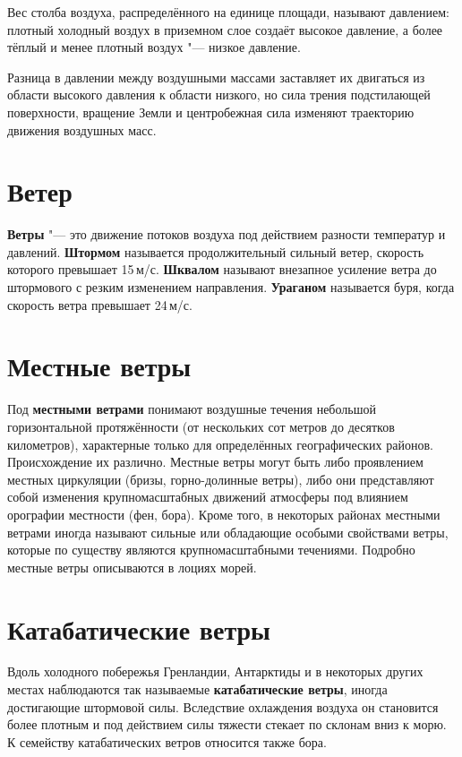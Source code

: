 \documentclass[a4paper, 12pt, twoside, final, book, russian, fittopage, cyremdash, openright]{ncc}
\newcommand{\mps}{\,м/с\xspace}
\begin{document}
Вес столба воздуха, распределённого на единице площади, называют
давлением: плотный холодный воздух в приземном слое
создаёт высокое давление, а более тёплый и менее плотный воздух "---
низкое давление.

Разница в давлении между воздушными массами заставляет их двигаться из
области высокого давления к области низкого, но сила трения
подстилающей поверхности, вращение Земли и центробежная сила изменяют
траекторию движения воздушных масс.

\section{Ветер}
\label{sec:wind}

\textbf{Ветры} "--- это движение потоков воздуха под
действием разности температур и
давлений. \textbf{Штормом} называется продолжительный
сильный ветер, скорость которого превышает 15\mps.
\textbf{Шквалом} называют внезапное усиление ветра до
штормового с резким изменением направления.
\textbf{Ураганом} называется буря, когда скорость ветра
превышает 24\mps.

\section{Местные ветры}
\label{sec:local_winds}

Под \textbf{местными ветрами} понимают воздушные течения небольшой
горизонтальной протяжённости (от нескольких сот метров до десятков
километров), характерные только для определённых географических
районов. Происхождение их различно. Местные ветры могут быть либо
проявлением местных циркуляции (бризы, горно-долинные
ветры), либо они представляют собой
изменения крупномасштабных движений атмосферы под влиянием орографии
местности (фен, бора). Кроме того, в некоторых
районах местными ветрами иногда называют сильные или обладающие
особыми свойствами ветры, которые по существу являются
крупномасштабными течениями. Подробно местные ветры описываются в
лоциях морей.

\section{Катабатические ветры}
\label{sec:catabatic_wind}

Вдоль холодного побережья Гренландии, Антарктиды и в некоторых других
местах наблюдаются так называемые \textbf{катабатические
  ветры}, иногда достигающие штормовой
силы. Вследствие охлаждения воздуха он становится более плотным и под
действием силы тяжести стекает по склонам вниз к морю. К семейству
катабатических ветров относится также бора.
\end{document}
